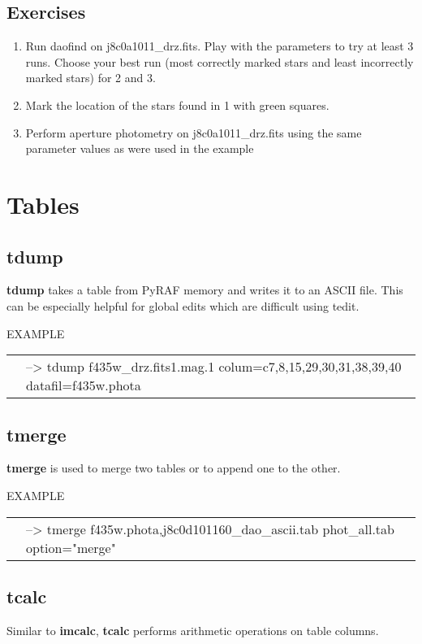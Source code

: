 \subsection{Exercises}
\begin{enumerate}
\item Run daofind on j8c0a1011\_drz.fits. Play with the parameters to try at least 3 runs. Choose your best run (most correctly marked stars and least incorrectly marked stars) for 2 and 3.
\item Mark the location of the stars found in 1 with green squares.
\item Perform aperture photometry on j8c0a1011\_drz.fits using the same parameter values as were used in the example
\end{enumerate}

\section{Tables}
\subsection{{\bf tdump}}
{\bf tdump} takes a table from PyRAF memory and writes it to an ASCII file. This can be especially helpful for global edits which are difficult using tedit.


EXAMPLE

\begin{tabular}{ll}
& {\color{RoyalBlue} --> tdump f435w\_drz.fits1.mag.1 colum=c7,8,15,29,30,31,38,39,40 datafil=f435w.phota} \\
\end{tabular}

\subsection{{\bf tmerge}}
{\bf tmerge} is used to merge two tables or to append one to the other. 

EXAMPLE

\begin{tabular}{ll}
& {\color{RoyalBlue}--> tmerge f435w.phota,j8c0d101160\_dao\_ascii.tab    phot\_all.tab option="merge"}
\end{tabular}

\subsection{{\bf tcalc}}
Similar to {\bf imcalc}, {\bf tcalc} performs arithmetic operations on table columns.

